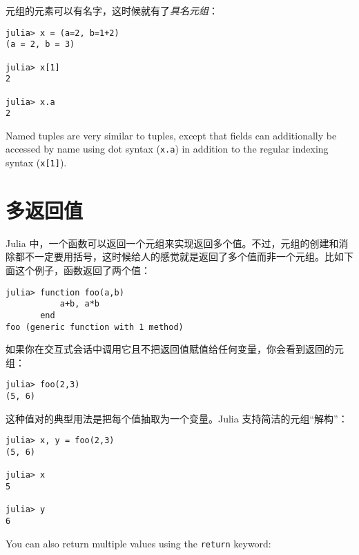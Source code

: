 元组的元素可以有名字，这时候就有了\emph{具名元组}：




\begin{verbatim}
julia> x = (a=2, b=1+2)
(a = 2, b = 3)

julia> x[1]
2

julia> x.a
2
\end{verbatim}



Named tuples are very similar to tuples, except that fields can additionally be accessed by name using dot syntax (\texttt{x.a}) in addition to the regular indexing syntax (\texttt{x[1]}).



\hypertarget{14329153377204363380}{}


\section{多返回值}



Julia 中，一个函数可以返回一个元组来实现返回多个值。不过，元组的创建和消除都不一定要用括号，这时候给人的感觉就是返回了多个值而非一个元组。比如下面这个例子，函数返回了两个值：




\begin{verbatim}
julia> function foo(a,b)
           a+b, a*b
       end
foo (generic function with 1 method)
\end{verbatim}



如果你在交互式会话中调用它且不把返回值赋值给任何变量，你会看到返回的元组：




\begin{verbatim}
julia> foo(2,3)
(5, 6)
\end{verbatim}



这种值对的典型用法是把每个值抽取为一个变量。Julia 支持简洁的元组“解构”：




\begin{verbatim}
julia> x, y = foo(2,3)
(5, 6)

julia> x
5

julia> y
6
\end{verbatim}



You can also return multiple values using the \texttt{return} keyword:




